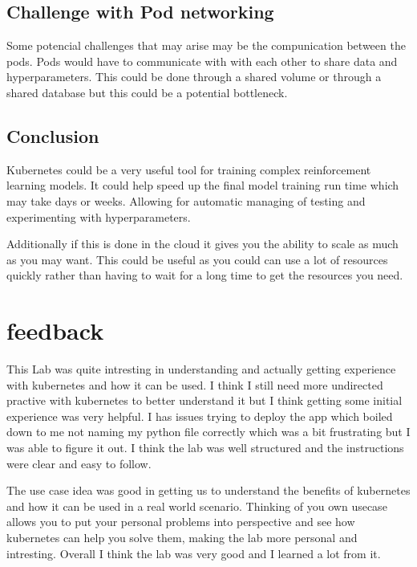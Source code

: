 \documentclass[12pt]{Article}
\begin{document}
\subsection{Challenge with Pod networking}
Some potencial challenges that may arise may be the compunication between the pods.
Pods would have to communicate with with each other to share data and hyperparameters.
This could be done through a shared volume or through a shared database but this could be a potential bottleneck.

\subsection{Conclusion}
Kubernetes could be a very useful tool for training complex reinforcement learning models.
It could help speed up the final model training run time which may take days or weeks.
Allowing for automatic managing of testing and experimenting with hyperparameters.

Additionally if this is done in the cloud it gives you the ability to scale as much as you may want.
This could be useful as you could can use a lot of resources quickly rather than having to wait for a long time to get the resources you need.

\section*{feedback}
This Lab was quite intresting in understanding and actually getting experience with kubernetes and how it can be used.
I think I still need more undirected practive with kubernetes to better understand it but I think getting some initial experience was very helpful.
I has issues trying to deploy the app which boiled down to me not naming my python file correctly which was a bit frustrating but I was able to figure it out.
I think the lab was well structured and the instructions were clear and easy to follow.

The use case idea was good in getting us to understand the benefits of kubernetes and how it can be used in a real world scenario.
Thinking of you own usecase allows you to put your personal problems into perspective and see how kubernetes can help you solve them, making the lab more personal and intresting.
Overall I think the lab was very good and I learned a lot from it.
\end{document}
